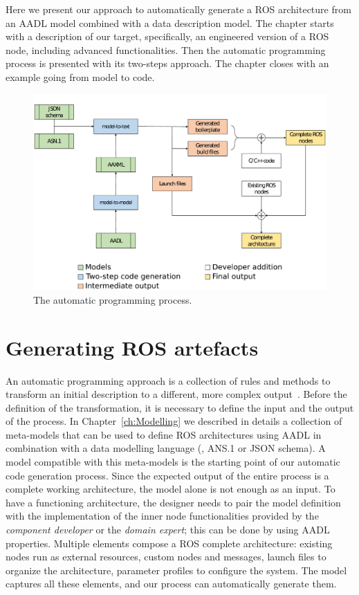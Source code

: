 Here we present our approach to automatically generate a ROS architecture from an AADL model combined with a data description model. The chapter starts with a description of our target, specifically, an engineered version of a ROS node, including advanced functionalities. Then the automatic programming process is presented with its two-steps approach. The chapter closes with an example going from model to code.

\minitoc
\newpage

\begin{figure}[t]
    \centering
    \includegraphics[width=\textwidth]{gfx/code-gen-process-leg}
    \caption[The automatic programming process.]{The automatic programming process. }\label{fig:code-gen}
\end{figure}

\section{Generating ROS artefacts}
An automatic programming approach is a collection of rules and methods to transform an initial description to a different, more complex output~\cite{balzer198515}. Before the definition of the transformation, it is necessary to define the input and the output of the process. In Chapter~\ref{ch:Modelling} we described in details a collection of meta-models that can be used to define ROS architectures using AADL in combination with a data modelling language (\ie, ANS.1 or JSON schema). A model compatible with this meta-models is the starting point of our automatic code generation process. Since the expected output of the entire process is a complete working architecture, the model alone is not enough as an input. To have a functioning architecture, the designer needs to pair the model definition with the implementation of the inner node functionalities provided by the \textit{component developer} or the \textit{domain expert}; this can be done by using AADL properties. Multiple elements compose a ROS complete architecture: existing nodes run as external resources, custom nodes and messages, launch files to organize the architecture, parameter profiles to configure the system. The model captures all these elements, and our process can automatically generate them.

